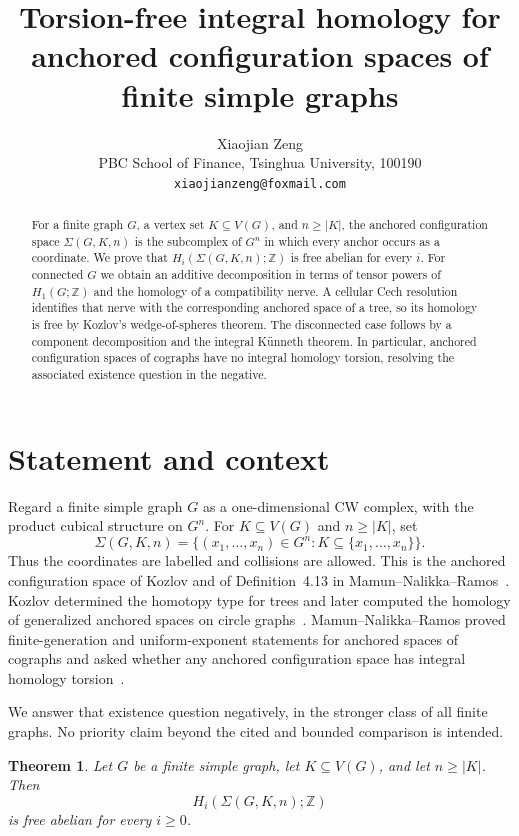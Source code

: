 \documentclass[11pt]{article}
\title{Torsion-free integral homology for anchored configuration spaces of finite simple graphs}
\author{Xiaojian Zeng\\
PBC School of Finance, Tsinghua University, 100190\\
\texttt{xiaojianzeng@foxmail.com}}
\date{}
\newtheorem{theorem}{Theorem}
\newcommand{\Z}{\mathbb Z}
\begin{document}
\maketitle

\begin{abstract}
For a finite graph $G$, a vertex set $K\subseteq V(G)$, and $n\geq |K|$, the anchored configuration space $\Sigma(G,K,n)$ is the subcomplex of $G^n$ in which every anchor occurs as a coordinate.  We prove that $H_i(\Sigma(G,K,n);\Z)$ is free abelian for every $i$.  For connected $G$ we obtain an additive decomposition in terms of tensor powers of $H_1(G;\Z)$ and the homology of a compatibility nerve.  A cellular Cech resolution identifies that nerve with the corresponding anchored space of a tree, so its homology is free by Kozlov's wedge-of-spheres theorem.  The disconnected case follows by a component decomposition and the integral K\"unneth theorem.  In particular, anchored configuration spaces of cographs have no integral homology torsion, resolving the associated existence question in the negative.
\end{abstract}

\section{Statement and context}

Regard a finite simple graph $G$ as a one-dimensional CW complex, with the product cubical structure on $G^n$.  For $K\subseteq V(G)$ and $n\geq |K|$, set
\[
 \Sigma(G,K,n)=\{(x_1,\ldots,x_n)\in G^n:K\subseteq\{x_1,\ldots,x_n\}\}.
\]
Thus the coordinates are labelled and collisions are allowed.  This is the anchored configuration space of Kozlov and of Definition~4.13 in Mamun--Nalikka--Ramos~\cite{kozlov2023,mamun2026}.  Kozlov determined the homotopy type for trees and later computed the homology of generalized anchored spaces on circle graphs~\cite{kozlov2023,kozlov2024}.  Mamun--Nalikka--Ramos proved finite-generation and uniform-exponent statements for anchored spaces of cographs and asked whether any anchored configuration space has integral homology torsion~\cite[Corollary~4.18 and p.~28]{mamun2026}.

We answer that existence question negatively, in the stronger class of all finite graphs.  No priority claim beyond the cited and bounded comparison is intended.

\begin{theorem}\label{thm:main}
Let $G$ be a finite simple graph, let $K\subseteq V(G)$, and let $n\geq |K|$.  Then
\[
 H_i(\Sigma(G,K,n);\Z)
\]
is free abelian for every $i\geq0$.
\end{theorem}
\end{document}
